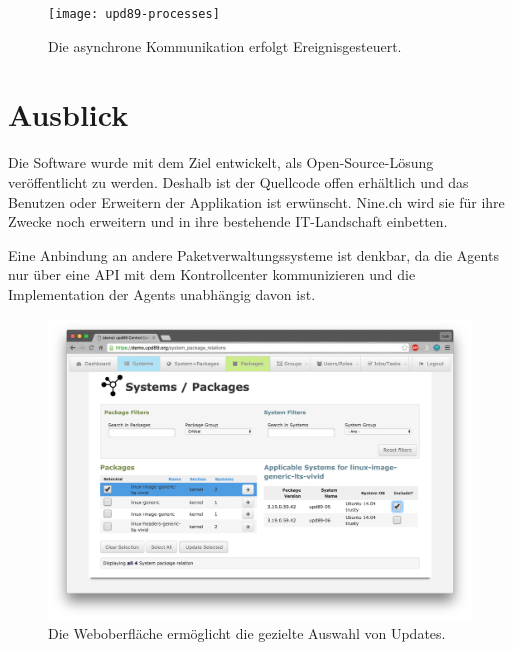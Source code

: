 \begin{figure}
  \centering
    \texttt{[image: upd89-processes]}
  \caption{Die asynchrone Kommunikation erfolgt Ereignisgesteuert.}
  \label{fig:processes}
\end{figure}

\section*{Ausblick}

Die Software wurde mit dem Ziel entwickelt, als Open-Source-Lösung veröffentlicht zu werden. Deshalb ist der Quellcode offen erhältlich und das Benutzen oder Erweitern der Applikation ist erwünscht. Nine.ch wird sie für ihre Zwecke noch erweitern und in ihre bestehende IT-Landschaft einbetten.

Eine Anbindung an andere Paketverwaltungssysteme ist denkbar, da die Agents nur über eine API mit dem Kontrollcenter kommunizieren und die Implementation der Agents unabhängig davon ist.

\begin{figure}
  \centering
    \includegraphics[width=\textwidth]{screenshot_comboview}
  \caption{Die Weboberfläche ermöglicht die gezielte Auswahl von Updates.}
  \label{fig:userinterface}
\end{figure}